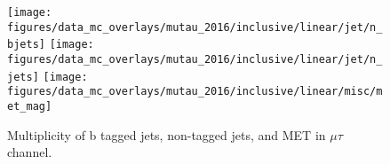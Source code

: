 \begin{figure}[htb!]
    \centering
    \texttt{[image: figures/data\_mc\_overlays/mutau\_2016/inclusive/linear/jet/n\_bjets]}
    \texttt{[image: figures/data\_mc\_overlays/mutau\_2016/inclusive/linear/jet/n\_jets]}
    \texttt{[image: figures/data\_mc\_overlays/mutau\_2016/inclusive/linear/misc/met\_mag]}
    \caption{Multiplicity of b tagged jets, non-tagged jets, and MET in
    $\mu\tau$ channel.}
    \label{fig:mutau_jetmet}
\end{figure}


